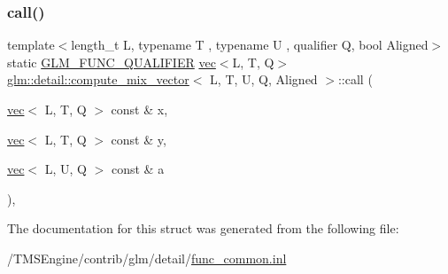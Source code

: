 \subsubsection{\texorpdfstring{call()}{call()}}
{\footnotesize\ttfamily template$<$length\+\_\+t L, typename T , typename U , qualifier Q, bool Aligned$>$ \\
static \hyperlink{setup_8hpp_a33fdea6f91c5f834105f7415e2a64407}{G\+L\+M\+\_\+\+F\+U\+N\+C\+\_\+\+Q\+U\+A\+L\+I\+F\+I\+ER} \hyperlink{structglm_1_1vec}{vec}$<$L, T, Q$>$ \hyperlink{structglm_1_1detail_1_1compute__mix__vector}{glm\+::detail\+::compute\+\_\+mix\+\_\+vector}$<$ L, T, U, Q, Aligned $>$\+::call (\begin{DoxyParamCaption}\item[{\hyperlink{structglm_1_1vec}{vec}$<$ L, T, Q $>$ const \&}]{x,  }\item[{\hyperlink{structglm_1_1vec}{vec}$<$ L, T, Q $>$ const \&}]{y,  }\item[{\hyperlink{structglm_1_1vec}{vec}$<$ L, U, Q $>$ const \&}]{a }\end{DoxyParamCaption})\hspace{0.3cm}{\ttfamily [inline]}, {\ttfamily [static]}}



The documentation for this struct was generated from the following file\+:\begin{DoxyCompactItemize}
\item 
/\+T\+M\+S\+Engine/contrib/glm/detail/\hyperlink{func__common_8inl}{func\+\_\+common.\+inl}\end{DoxyCompactItemize}
